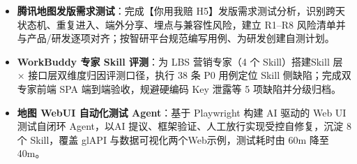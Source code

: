 \documentclass[10pt]{article}
\begin{document}
    \begin{itemize}
        \item \textbf{腾讯地图发版需求测试}：完成【你用我赔 H5】发版需求测试分析，识别跨天状态机、重复进入、端外分享、埋点与兼容性风险，建立 R1--R8 风险清单并与产品/研发逐项对齐；按智研平台规范编写用例、为研发创建自测计划。

        \item \textbf{WorkBuddy 专家 Skill 评测}：为 LBS 营销专家（4 个 Skill）搭建Skill 层 × 接口层双维度归因评测口径，执行 38 条 P0 用例定位 Skill 侧缺陷；完成双专家前端 SPA 端到端验收，规避硬编码 Key 泄露等 5 项缺陷并分级归档。
        \item \textbf{地图 WebUI 自动化测试 Agent}：基于 Playwright 构建 AI 驱动的 Web UI 测试自闭环 Agent，以AI 提议、框架验证、人工放行实现受控自修复，沉淀 8 个 Skill，覆盖 glAPI 与数据可视化两个Web示例，测试耗时由 60m 降至 40m。
    \end{itemize}

    \vspace{0.25em}

\end{document}
